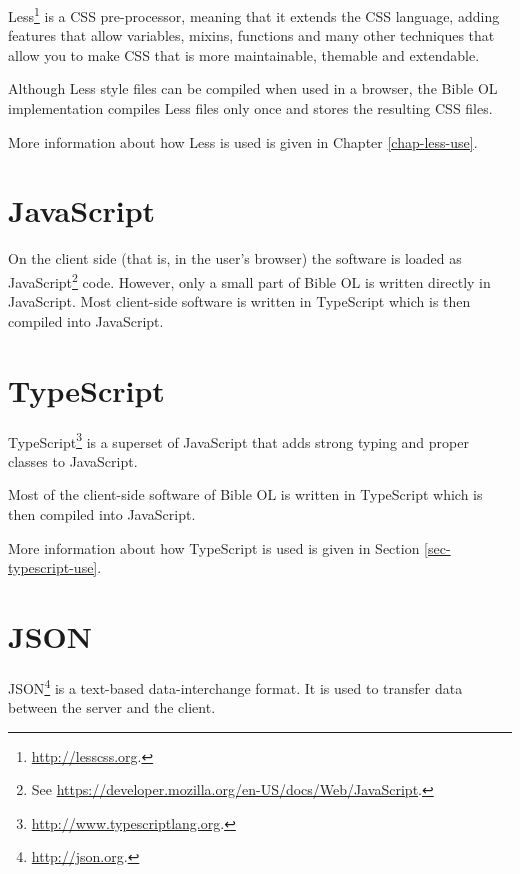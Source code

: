 \documentclass[11pt,oneside,a4paper]{memoir}
\begin{document}
Less\footnote{\url{http://lesscss.org}.} is a CSS pre-processor, meaning that it
extends the CSS language, adding features that allow variables, mixins, functions and many other
techniques that allow you to make CSS that is more maintainable, themable and extendable.

Although Less style files can be compiled when used in a browser, the Bible OL implementation
compiles Less files only once and stores the resulting CSS files.

More information about how Less is used is given in Chapter \ref{chap-less-use}.

\section{JavaScript}

On the client side (that is, in the user's browser) the software is loaded as
JavaScript\footnote{See \url{https://developer.mozilla.org/en-US/docs/Web/JavaScript}.} code.
However, only a small part of Bible OL is written directly in JavaScript. Most client-side software
is written in TypeScript which is then compiled into JavaScript.

\section{TypeScript}\label{sec-typescript}

TypeScript\footnote{\url{http://www.typescriptlang.org}.} is a superset of JavaScript that adds
strong typing and proper classes to JavaScript.

Most of the client-side software of Bible OL is written in TypeScript which is then compiled into
JavaScript.

More information about how TypeScript is used is given in Section
\ref{sec-typescript-use}.

\section{JSON}

JSON\footnote{\url{http://json.org}.} is a text-based data-interchange format. It is used to
transfer data between the server and the client.

\end{document}
